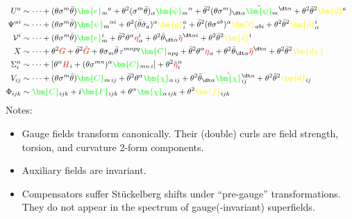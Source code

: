 \documentclass[letter,12pt]{article} %
\def\physical#1{ {\color{green} {\bm {#1}} } }
\def\auxiliary#1{ {\color{yellow} {\bm {#1}} } }
\def\compensating#1{ {\color{red}  #1} }
\def\frameXX{ \physical{e} }
\def\frameXY{ \physical{e} }
\def\CXXX{ \physical{C} }
\def\CXXY{ \physical{C} }
\def\CXYY{ \physical{C} }
\def\CYYY{ \physical{C} }
\def\grinoXX{ \physical{\psi} }
\def\grinoXY{ \physical{\psi} }
\def\spinorYY{ \physical{\chi} }
\def\spinorYYY{ \physical{\chi} }
\def\d{ \auxiliary{d_X} }
\def\dX{ \auxiliary{d} }
\def\dY{ \auxiliary{d} }
\def\dYY{ \auxiliary{d} }
\def\f{\auxiliary{f} }
\def\y{ \auxiliary{y} }
\def\t{ \auxiliary{t} }
\def\r{ \auxiliary{\rho} }
\def\surfeit{ \compensating{\eta} }
\def\compX{ \compensating{G} }
\def\compY{ \compensating{H} }
\def\calibration{ \physical{F} }
\begin{document}
{%
\begin{align}
U^a &\sim \cdots 
	+ (\theta \sigma^m \bar \theta) \frameXX_m{}^a 
	+ \theta^2 (\sigma^m \bar \theta)_\alpha \grinoXX_m{}^\alpha 
	+ \bar \theta^2 (\theta \sigma^m )_{\dt \alpha} \bar \grinoXX_m{}^{\dt \alpha }
	+ \theta^2 \bar \theta^2 \dX^a
\cr
\Psi^{\alpha i} &\sim \cdots 
	+ (\theta \sigma^m \bar \theta) \grinoXY_m{}^{\alpha i}
	+ \theta^2 (\bar \theta \bar \sigma_a)^\alpha \y_i^a
	+ \bar \theta^2 (\theta \sigma^{ab})^\alpha \t_{ab i} 
	+ \theta^2 \bar \theta^2 \r^i_\alpha
\cr
\mathcal V^i &\sim \cdots 
	+ (\theta \sigma^m \bar \theta) \frameXY_m^i 
	+ \bar \theta^2 \theta^\alpha \surfeit_\alpha^i
	+ \theta^2 \bar \theta_{\dt \alpha}\bar \surfeit^{\dt \alpha i}
	+ \theta^2\bar \theta^2 \dY^i
\cr
X &\sim \cdots 
	+ \theta^2 \compX
	+ \bar \theta^2 \bar \compX
	+ \theta \sigma_m \bar \theta \mathcal \, \varepsilon^{mnpq} \CXXX_{npq}
	+ \bar \theta^2 \theta^\alpha \surfeit_\alpha
	+ \theta^2 \bar \theta_{\dt \alpha}\bar \surfeit^{\dt \alpha}
	+ \theta^2\bar \theta^2 \d
\cr
\Sigma_i^\alpha &\sim \cdots	
	+ [\theta^\alpha \compY_i + (\theta \sigma^{mn})^\alpha \CXXY_{mn \, i} ] 
	+  \theta^2 \tilde \surfeit_i^\alpha
\cr
V_{ij} &\sim \cdots 
	+  (\theta \sigma^m \bar \theta)  \CXYY_{m\, ij}
	+ \bar \theta^2 \theta^\alpha \spinorYY_{\alpha \, ij} 
	+ \theta^2 \bar \theta_{\dt \alpha}\bar \spinorYY_{ij}^{\dt \alpha}
	+ \theta^2\bar \theta^2 \dYY_{ij}
\cr
\Phi_{ijk} &\sim \CYYY_{ijk} + i \calibration_{ijk}  
	+ \theta^\alpha \spinorYYY_{\alpha\, ijk}
	+ \theta^2 \f_{ijk}
\nonumber
\end{align}
}
Notes:
\begin{itemize} 
	\item {\color{PineGreen} Gauge fields} transform canonically. Their (double) curls are field strength, torsion, and curvature 2-form components. 
	\item {\color{Orange} Auxiliary fields} are invariant. 
	\item {\color{Red} Compensators} suffer St\"uckelberg shifts under ``pre-gauge'' transformations. They do not appear in the spectrum of gauge(-invariant) superfields.
\end{itemize}
\end{document}
